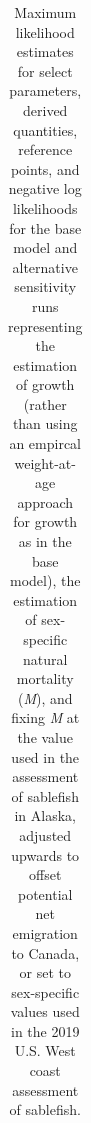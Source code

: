 \documentclass[
  english,
]{article}
\begin{document}
\begin{landscape}
\begin{longtable}
\end{longtable}

\endgroup

\end{landscape}

\pagebreak

\begin{landscape}

\begingroup
\fontsize{8.0pt}{9.0pt}\selectfont

\begin{longtable}{>{\raggedright\arraybackslash}p{\dimexpr 131.25pt -2\tabcolsep-1.5\arrayrulewidth}>{\raggedleft\arraybackslash}p{\dimexpr 75.00pt -2\tabcolsep-1.5\arrayrulewidth}>{\raggedleft\arraybackslash}p{\dimexpr 75.00pt -2\tabcolsep-1.5\arrayrulewidth}>{\raggedleft\arraybackslash}p{\dimexpr 75.00pt -2\tabcolsep-1.5\arrayrulewidth}>{\raggedleft\arraybackslash}p{\dimexpr 75.00pt -2\tabcolsep-1.5\arrayrulewidth}>{\raggedleft\arraybackslash}p{\dimexpr 75.00pt -2\tabcolsep-1.5\arrayrulewidth}>{\raggedleft\arraybackslash}p{\dimexpr 75.00pt -2\tabcolsep-1.5\arrayrulewidth}}

\caption{\label{tbl-sens-3}Maximum likelihood estimates for select
parameters, derived quantities, reference points, and negative log
likelihoods for the base model and alternative sensitivity runs
representing the estimation of growth (rather than using an empircal
weight-at-age approach for growth as in the base model), the estimation
of sex-specific natural mortality (\emph{M}), and fixing \emph{M} at the
value used in the assessment of sablefish in Alaska, adjusted upwards to
offset potential net emigration to Canada, or set to sex-specific values
used in the 2019 U.S. West coast assessment of sablefish.}

\tabularnewline


\end{longtable}
\end{landscape}
\end{document}

